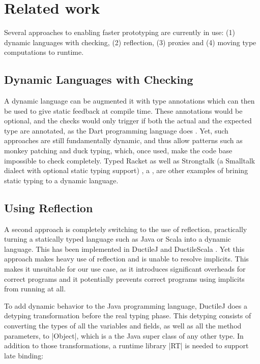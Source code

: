 \section{Related work}

Several approaches to enabling faster prototyping are currently in use: (1) dynamic languages with checking, (2) reflection, (3) proxies and (4) moving type computations to runtime.

\subsection{Dynamic Languages with Checking}

A dynamic language can be augmented it with type annotations which can then be used to give static feedback at compile time. These annotations would be optional, and the checks would only trigger if both the actual and the expected type are annotated, as the Dart programming language does \cite{dart}. Yet, such approaches are still fundamentally dynamic, and thus allow patterns such as monkey patching and duck typing, which, once used, make the code base impossible to check completely.
Typed Racket \cite{racket} as well as Strongtalk (a Smalltalk dialect with optional static typing support) \cite{strongtalk}, a , are other examples of brining static typing to a dynamic language.

\subsection{Using Reflection}

A second approach is completely switching to the use of reflection, practically turning a statically typed language such as Java or Scala into a dynamic language. This has been implemented in DuctileJ and DuctileScala \cite{ductilej,ductilescala}. Yet this approach makes heavy use of reflection and is unable to resolve implicits. This makes it unsuitable for our use case, as it introduces significant overheads for correct programs and it potentially prevents correct programs using implicits from running at all.

To add dynamic behavior to the Java programming language, DuctileJ \cite{ductilej} does a detyping transformation before the real typing phase. This detyping consists of converting the types of all the variables and fields, as well as all the method parameters, to |Object|, which is a the Java super class of any other type. In addition to those transformations, a runtime library |RT| is needed to support late binding:

